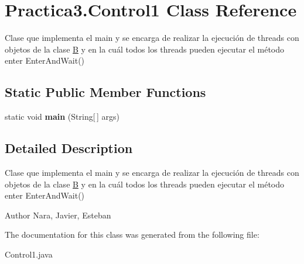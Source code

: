 \hypertarget{class_practica3_1_1_control1}{}\section{Practica3.\+Control1 Class Reference}
\label{class_practica3_1_1_control1}


Clase que implementa el main y se encarga de realizar la ejecución de threads con objetos de la clase \hyperlink{class_practica3_1_1_b}{B} y en la cuál todos los threads pueden ejecutar el método enter Enter\+And\+Wait()  


\subsection*{Static Public Member Functions}
\begin{DoxyCompactItemize}
\item 
\hypertarget{class_practica3_1_1_control1_a58e402b0152caaf34e119ab278ddeb71}{}static void {\bfseries main} (String\mbox{[}$\,$\mbox{]} args)\label{class_practica3_1_1_control1_a58e402b0152caaf34e119ab278ddeb71}

\end{DoxyCompactItemize}


\subsection{Detailed Description}
Clase que implementa el main y se encarga de realizar la ejecución de threads con objetos de la clase \hyperlink{class_practica3_1_1_b}{B} y en la cuál todos los threads pueden ejecutar el método enter Enter\+And\+Wait() 

\begin{DoxyAuthor}{Author}
Nara, Javier, Esteban 
\end{DoxyAuthor}


The documentation for this class was generated from the following file\+:\begin{DoxyCompactItemize}
\item 
Control1.\+java\end{DoxyCompactItemize}
